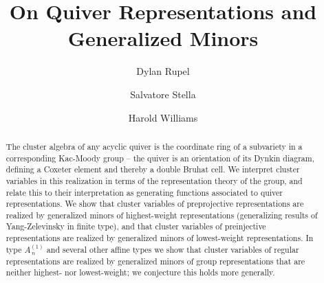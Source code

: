 \documentclass[12pt]{amsart}
\numberwithin{equation}{section}
\begin{document}
\title{On Quiver Representations and Generalized Minors}

\author[Rupel]{Dylan Rupel}
\address[Dylan Rupel]{University of Notre Dame}

\author[Stella]{Salvatore Stella}
\address[Salvatore Stella]{Universit\`a degli studi di Roma ``La Sapienza''}

\author[Williams]{Harold Williams}
\address[Harold Williams]{University of Texas at Austin}

\begin{abstract}
The cluster algebra of any acyclic quiver is the coordinate ring of a subvariety in a corresponding Kac-Moody group -- the quiver is an orientation of its Dynkin diagram, defining a Coxeter element and thereby a double Bruhat cell. We interpret cluster variables in this realization in terms of the representation theory of the group, and relate this to their interpretation as generating functions associated to quiver representations. We show that cluster variables of preprojective representations are realized by generalized minors of highest-weight representations (generalizing results of Yang-Zelevinsky in finite type), and that cluster variables of preinjective representations are realized by generalized minors of lowest-weight representations. In type $A_{\:n}^{(1)}$ and several other affine types we show that cluster variables of regular representations are realized by generalized minors of group representations that are neither highest- nor lowest-weight; we conjecture this holds more generally.




\end{abstract}
\end{document}
